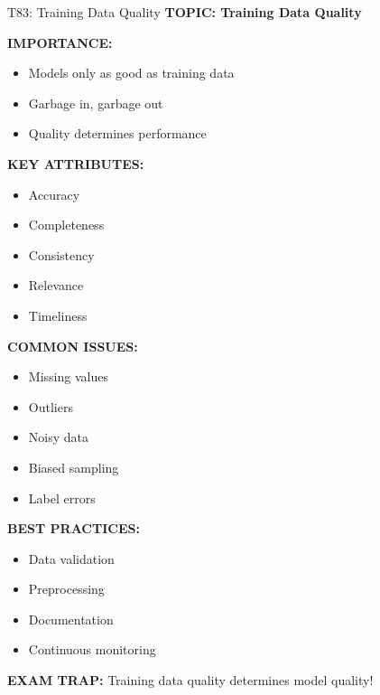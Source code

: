 \documentclass[8pt]{beamer}
\begin{document}
	\begin{frame}{T83: Training Data Quality}
		\fontsize{6.5}{7.5}\selectfont
		\textbf{TOPIC: Training Data Quality}
		
		\vspace{0.1cm}
		\textbf{IMPORTANCE:}
		\begin{itemize}
			\item Models only as good as training data
			\item Garbage in, garbage out
			\item Quality determines performance
		\end{itemize}
		
		\vspace{0.1cm}
		\textbf{KEY ATTRIBUTES:}
		\begin{itemize}
			\item Accuracy
			\item Completeness
			\item Consistency
			\item Relevance
			\item Timeliness
		\end{itemize}
		
		\vspace{0.1cm}
		\textbf{COMMON ISSUES:}
		\begin{itemize}
			\item Missing values
			\item Outliers
			\item Noisy data
			\item Biased sampling
			\item Label errors
		\end{itemize}
		
		\vspace{0.1cm}
		\textbf{BEST PRACTICES:}
		\begin{itemize}
			\item Data validation
			\item Preprocessing
			\item Documentation
			\item Continuous monitoring
		\end{itemize}
		
		\textcolor{myred}{\textbf{EXAM TRAP:}} Training data quality \textcolor{myblue}{determines model quality}!
	\end{frame}
	
\end{document}
